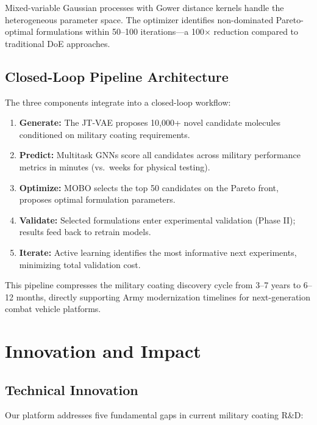 \documentclass[11pt,letterpaper]{article}
\begin{document}
Mixed-variable Gaussian processes with Gower distance kernels handle the heterogeneous parameter space. The optimizer identifies non-dominated Pareto-optimal formulations within 50--100 iterations---a 100$\times$ reduction compared to traditional DoE approaches.

\subsection{Closed-Loop Pipeline Architecture}

The three components integrate into a closed-loop workflow:

\begin{enumerate}[nosep]
  \item \textbf{Generate:} The JT-VAE proposes 10,000+ novel candidate molecules conditioned on military coating requirements.
  \item \textbf{Predict:} Multitask GNNs score all candidates across military performance metrics in minutes (vs.\ weeks for physical testing).
  \item \textbf{Optimize:} MOBO selects the top 50 candidates on the Pareto front, proposes optimal formulation parameters.
  \item \textbf{Validate:} Selected formulations enter experimental validation (Phase II); results feed back to retrain models.
  \item \textbf{Iterate:} Active learning identifies the most informative next experiments, minimizing total validation cost.
\end{enumerate}

This pipeline compresses the military coating discovery cycle from 3--7 years to 6--12 months, directly supporting Army modernization timelines for next-generation combat vehicle platforms.


\section{Innovation and Impact}
\label{sec:innovation_impact}

\subsection{Technical Innovation}

Our platform addresses five fundamental gaps in current military coating R\&D:
\end{document}
